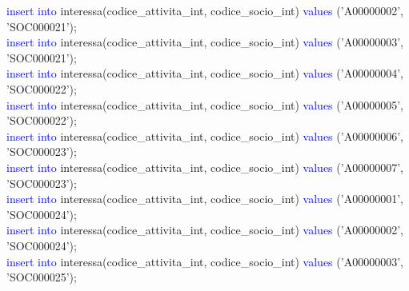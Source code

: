 \documentclass{article}
\begin{document}
\begin{flushleft}
{        \hspace*{0.5em}\textcolor{blue}{insert into} interessa(codice\_attivita\_int, codice\_socio\_int) \textcolor{blue}{values} \hspace*{0.5em}('A00000002', 'SOC000021'); \\
        \hspace*{0.5em}\textcolor{blue}{insert into} interessa(codice\_attivita\_int, codice\_socio\_int) \textcolor{blue}{values} \hspace*{0.5em}('A00000003', 'SOC000021'); \\
        \hspace*{0.5em}\textcolor{blue}{insert into} interessa(codice\_attivita\_int, codice\_socio\_int) \textcolor{blue}{values} \hspace*{0.5em}('A00000004', 'SOC000022'); \\
        \hspace*{0.5em}\textcolor{blue}{insert into} interessa(codice\_attivita\_int, codice\_socio\_int) \textcolor{blue}{values} \hspace*{0.5em}('A00000005', 'SOC000022'); \\
        \hspace*{0.5em}\textcolor{blue}{insert into} interessa(codice\_attivita\_int, codice\_socio\_int) \textcolor{blue}{values} \hspace*{0.5em}('A00000006', 'SOC000023'); \\
        \hspace*{0.5em}\textcolor{blue}{insert into} interessa(codice\_attivita\_int, codice\_socio\_int) \textcolor{blue}{values} \hspace*{0.5em}('A00000007', 'SOC000023'); \\
        \hspace*{0.5em}\textcolor{blue}{insert into} interessa(codice\_attivita\_int, codice\_socio\_int) \textcolor{blue}{values} \hspace*{0.5em}('A00000001', 'SOC000024'); \\
        \hspace*{0.5em}\textcolor{blue}{insert into} interessa(codice\_attivita\_int, codice\_socio\_int) \textcolor{blue}{values} \hspace*{0.5em}('A00000002', 'SOC000024'); \\
        \hspace*{0.5em}\textcolor{blue}{insert into} interessa(codice\_attivita\_int, codice\_socio\_int) \textcolor{blue}{values} \hspace*{0.5em}('A00000003', 'SOC000025'); \\
}
\end{flushleft}
\end{document}

